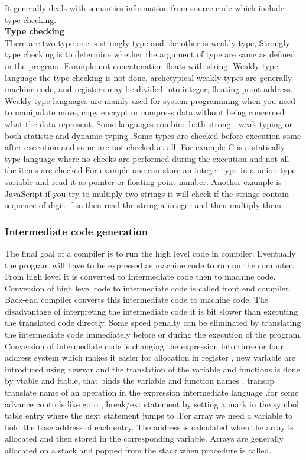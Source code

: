 \documentclass[23pt]{article}
\begin{document}
{\Large It generally deals with semantics information from source code which include type checking. \\
\textbf{Type checking} \\
There are two type one is strongly type and the other is weakly type, Strongly type checking is to determine whether the argument of type are same as defined in the program. Example not concatenation floats with string. Weakly type language the type checking is not done, archetypical weakly types are generally machine code, and registers may be divided into integer, floating point address. Weakly type languages are mainly used for system programming when you need to manipulate move, copy encrypt or compress data without being concerned what the data represent. Some languages combine both strong , weak typing or both statistic and dynamic typing .Some types are checked before execution some after execution and some are not checked at all. For example C is a statically type language where no checks are performed during the execution and not all the items are checked
For example one can store an integer type in a union type variable and read it as pointer or floating point number. Another example is JavaScript if you try to multiply two strings it will check if the strings contain sequence of digit if so then read the string a integer and then multiply them.\\ \par}

\subsubsection{Intermediate code generation} 
{\Large The final goal of a compiler is to run the high level code in compiler. Eventually the program will have to be expressed as machine code to run on the computer. From high level it is converted to 
Intermediate code then to machine code. Conversion of high level code to intermediate code is called front end compiler. Back-end compiler converts this intermediate code to machine code.
The disadvantage of interpreting the intermediate code it is bit slower than executing the translated code directly. Some speed penalty can be eliminated by translating the intermediate code immediately before or during the execution of the program. Conversion of intermediate  code is changing the expression into three or four address system which makes it easier for allocation in register , new variable are introduced using newvar and the translation of the variable and functions is done by vtable and ftable, that binds the variable and function names , transop translate name of an operation in the expression intermediate language .for some advance controls like goto , break/ext statement by setting a mark in the symbol table  entry where the next statement jumps to .For array we need a variable to hold the base address of each entry. The address is calculated when the array is allocated and then stored in the corresponding variable. Arrays are generally allocated on a stack and popped from the stack when procedure is called. \par}
\end{document}

